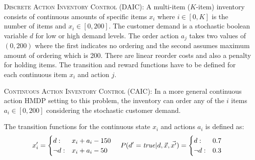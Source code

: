 \documentclass[twoside,11pt]{article}
\newcommand{\InventoryControl}{\textsc{Inventory Control }}
\begin{document}
\textsc{Discrete Action} \InventoryControl (\textsc{DAIC}): 
A multi-item ($K$-item) inventory consists of continuous amounts of specific items $x_i$ where $i \in [0,K]$ is the number of items and $x_i \in [0,200]$. The customer demand is a stochastic boolean variable $d$ for low or high demand levels.  The order action $a_j$ takes two values of $(0,200)$ where the first indicates no ordering and the second assumes maximum amount of ordering which is 200. There are linear reorder costs and also a penalty for holding items. The transition and reward functions have to be defined for each continuous item $x_i$ and action $j$.

\vspace{2mm}
\textsc{Continuous Action}  \InventoryControl (\textsc{CAIC}):
In a more general  continuous action HMDP setting to this problem, the inventory can order  any of the $i$ items $a_i \in [0,200]$ considering the stochastic customer demand. 

The transition functions for the continuous state $x_i$ and actions $a_i$ is defined as: 
{%
\vspace{-2mm}
\begin{align}
x'_i= \begin{cases}
d  : & x_i + a_i - 150 \\
\neg d : & x_i + a_i - 50    
\end{cases} 
\hspace{4mm}
 P(d'=\mathit{true}|d,\vec{x},\vec{x'})=  \begin{cases}
d     :& 0.7\\
\neg d : & 0.3	\\
\end{cases} \label{eq:trans_inv}
\end{align}
\vspace{-2mm}}
\end{document}
